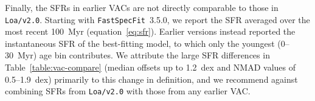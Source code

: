 \documentclass[modern,linenumbers]{aastex702}
\newcommand{\fastspecfit}{\texttt{FastSpecFit}}
\begin{document}
\begin{appendix}
Finally, the SFRs in earlier VACs are not directly comparable to
  those in \texttt{Loa/v2.0}. Starting with \fastspecfit{}~3.5.0, we
  report the SFR averaged over the most recent 100~Myr
  (equation~\ref{eq:sfr}). Earlier versions instead reported the
  instantaneous SFR of the best-fitting model, to which only the
  youngest (0--30~Myr) age bin contributes. We attribute the large SFR
  differences in Table~\ref{table:vac-compare} (median offsets up to
  1.2~dex and NMAD values of 0.5--1.9~dex) primarily to this change in
  definition, and we recommend against combining SFRs from
  \texttt{Loa/v2.0} with those from any earlier VAC.

\end{appendix}



\end{document}
